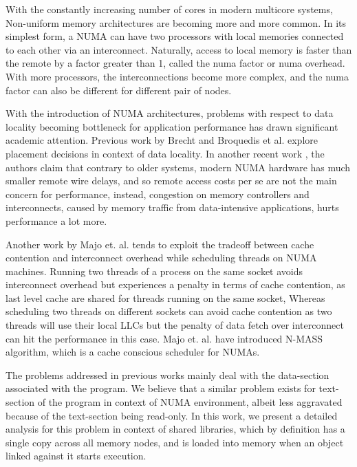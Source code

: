 
With the constantly increasing number of cores in modern multicore systems, Non-uniform memory architectures
are becoming more and more common. In its simplest form, a NUMA can have two processors with local memories connected
to each other via an interconnect. Naturally, access to local memory is faster than the remote by a factor greater than 1,
called the numa factor or numa overhead. With more processors, the interconnections become more complex, and the numa factor
can also be different for different pair of nodes.

With the introduction of NUMA architectures, problems with respect to data locality becoming bottleneck for application performance
has drawn significant academic attention. Previous work by Brecht\cite{Brecht:1993:IPA:1295480.1295481} and 
Broquedis et al.\cite{numaScheduling} explore placement decisions in context of data locality.
In another recent work \cite{Dashti:2013:TMH:2490301.2451157}, the authors claim that contrary to older systems,
modern NUMA hardware has much smaller remote wire delays, and so remote access costs per se are not the main 
concern for performance, instead, congestion on memory controllers and interconnects, caused by memory traffic 
from data-intensive applications, hurts performance a lot more.

Another work by Majo et. al. \cite{Majo:2011:MMN:1993478.1993481} tends to exploit the tradeoff between cache contention
and interconnect overhead while scheduling threads on NUMA machines. Running two threads of a process on the same socket
avoids interconnect overhead but experiences a penalty in terms of cache contention, as last level cache are shared for
threads running on the same socket, Whereas scheduling two threads on different sockets can avoid cache contention
as two threads will use their local LLCs but the penalty of data fetch over interconnect can hit the performance in this case.
Majo et. al. \cite{Majo:2011:MMN:1993478.1993481} have introduced N-MASS algorithm, which is a cache conscious scheduler for NUMAs.

The problems addressed in previous works mainly deal with the data-section associated with the program. We believe that
a similar problem exists for text-section of the program in context of NUMA environment, albeit less aggravated
because of the text-section being read-only. In this work, we present a detailed analysis for this problem in context of
shared libraries, which by definition has a single copy across all memory nodes, and is loaded into memory when an object
linked against it starts execution.

